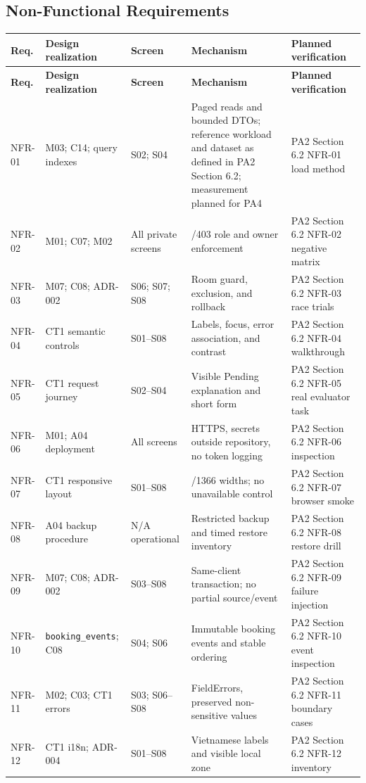 \subsection{Non-Functional Requirements}
\begingroup
\small
{}
\setlength{\tabcolsep}{2pt}
\renewcommand{\arraystretch}{1.1}
\begin{longtable}{|>{\raggedright\arraybackslash}p{}|>{\raggedright\arraybackslash}p{}|>{\raggedright\arraybackslash}p{}|>{\raggedright\arraybackslash}p{}|>{\raggedright\arraybackslash}p{}|}
\hline
\textbf{Req.} & \textbf{Design realization} & \textbf{Screen} & \textbf{Mechanism} & \textbf{Planned verification} \\
\hline
\endfirsthead
\hline
\textbf{Req.} & \textbf{Design realization} & \textbf{Screen} & \textbf{Mechanism} & \textbf{Planned verification} \\
\hline
\endhead
\hline
\endfoot
\hline
\endlastfoot
NFR-01 & M03; C14; query indexes & S02; S04 & Paged reads and bounded DTOs; reference workload and dataset as defined in PA2 Section 6.2; measurement planned for PA4 & PA2 Section 6.2 NFR-01 load method \\ \hline
NFR-02 & M01; C07; M02 & All private screens & 401/403 role and owner enforcement & PA2 Section 6.2 NFR-02 negative matrix \\ \hline
NFR-03 & M07; C08; ADR-002 & S06; S07; S08 & Room guard, exclusion, and rollback & PA2 Section 6.2 NFR-03 race trials \\ \hline
NFR-04 & CT1 semantic controls & S01--S08 & Labels, focus, error association, and contrast & PA2 Section 6.2 NFR-04 walkthrough \\ \hline
NFR-05 & CT1 request journey & S02--S04 & Visible Pending explanation and short form & PA2 Section 6.2 NFR-05 real evaluator task \\ \hline
NFR-06 & M01; A04 deployment & All screens & HTTPS, secrets outside repository, no token logging & PA2 Section 6.2 NFR-06 inspection \\ \hline
NFR-07 & CT1 responsive layout & S01--S08 & 390/1366 widths; no unavailable control & PA2 Section 6.2 NFR-07 browser smoke \\ \hline
NFR-08 & A04 backup procedure & N/A operational & Restricted backup and timed restore inventory & PA2 Section 6.2 NFR-08 restore drill \\ \hline
NFR-09 & M07; C08; ADR-002 & S03--S08 & Same-client transaction; no partial source/event & PA2 Section 6.2 NFR-09 failure injection \\ \hline
NFR-10 & \texttt{booking\_events}; C08 & S04; S06 & Immutable booking events and stable ordering & PA2 Section 6.2 NFR-10 event inspection \\ \hline
NFR-11 & M02; C03; CT1 errors & S03; S06--S08 & FieldErrors, preserved non-sensitive values & PA2 Section 6.2 NFR-11 boundary cases \\ \hline
NFR-12 & CT1 i18n; ADR-004 & S01--S08 & Vietnamese labels and visible local zone & PA2 Section 6.2 NFR-12 inventory \\ \hline
\end{longtable}
\endgroup

